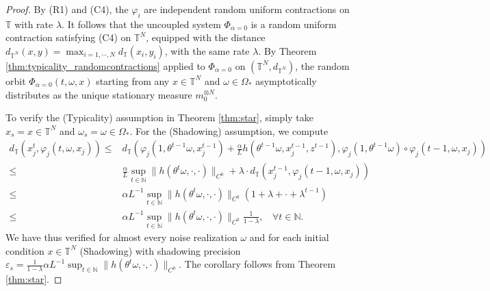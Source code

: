 \documentclass[a4paper]{article}
\theoremstyle{plain}
\theoremstyle{definition}
\newcommand{\T}{\mathbb{T}}
\newcommand{\N}{\mathbb{N}}
\begin{document}
\begin{proof}
By (R1) and (C4), the $\varphi_i$ are independent random uniform contractions on $\T$ with rate $\lambda$. It follows that  the uncoupled system $\Phi_{\alpha=0}$ is a random uniform contraction satisfying (C4) on $\T^{N}$, equipped with the distance $d_{\T^{N}}(x,y)= \max_{i=1,\cdots,N} d_{\T}(x_i,y_i)$, with the same rate $\lambda$. By Theorem \ref{thm:typicality_randomcontractions} applied to $\Phi_{\alpha=0}$ on $(\T^{N},d_{\T^{N}})$, the random orbit $\Phi_{\alpha=0}(t,\omega,x)$ starting from any $x\in\T^N$ and $\omega\in\Omega_*$ asymptotically distributes as the unique stationary measure $m_0^{\otimes N}$. 


To verify the (Typicality) assumption in Theorem \ref{thm:star}, simply take $x_s=x\in\T^N$ and $\omega_s=\omega\in\Omega_*$.
	For the (Shadowing) assumption, we compute
	\begin{align*}
		d_{\T}(x_j^t, \varphi_j(t,\omega,x_j)) \leq & d_{\T}\left(\varphi_j(1,\theta^{t-1}\omega,x_j^{t-1}) + \frac{\alpha}{L}  h(\theta^{t-1}\omega,x_j^{t-1},z^{t-1}), \varphi_j(1,\theta^{t-1}\omega)\circ \varphi_j(t-1,\omega,x_j)\right)\\
		\leq & \frac{\alpha}{L} \sup_{t\in\N} \|h(\theta^t\omega,\cdot,\cdot)\|_{C^0}+ \lambda\cdot d_{\T}(x_j^{t-1}, \varphi_j(t-1,\omega,x_j))\\
		\leq& \alpha  L^{-1} \sup_{t\in\N} \|h(\theta^t\omega,\cdot,\cdot)\|_{C^0}(1+\lambda + \cdot + \lambda^{t-1}) \\
		\leq & \alpha  L^{-1} \sup_{t\in\N} \|h(\theta^t\omega,\cdot,\cdot)\|_{C^0} \frac{1}{1-\lambda},~~~~\forall t\in\N.
	\end{align*}
	We have thus verified for almost every noise realization $\omega$ and for each initial condition $x\in\T^N$ (Shadowing) with %
	shadowing precision $\varepsilon_s =  \frac{1}{1-\lambda} \alpha L^{-1} \sup_{t\in\N} \|h(\theta^t\omega,\cdot,\cdot)\|_{C^0}$. 
	The corollary follows from Theorem \ref{thm:star}.
\end{proof}
\end{document}
